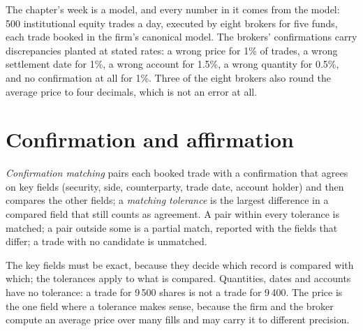The chapter's week is a model, and every number in it comes from the model: 500 institutional equity trades a day, executed by eight brokers for
five funds, each trade booked in the firm's canonical model. The brokers' confirmations carry discrepancies planted at stated rates: a wrong
price for 1\% of trades, a wrong settlement date for 1\%, a wrong account for 1.5\%, a wrong quantity for 0.5\%, and no confirmation at all
for 1\%. Three of the eight brokers also round the average price to four decimals, which is not an error at all.

\section{Confirmation and affirmation}

\begin{definition}\label{def:pl:post-trade-systems:matching}
\emph{Confirmation matching} pairs each booked trade with a confirmation that agrees on key fields (security,
side, counterparty, trade date, account holder) and then compares the other fields; a \emph{matching tolerance} is
the largest difference in a compared field that still counts as agreement. A pair within every tolerance is matched; a pair outside some is a
partial match, reported with the fields that differ; a trade with no candidate is unmatched.
\end{definition}

\label{lst:pl:post-trade-systems:match}

The key fields must be exact, because they decide which record is compared with which; the tolerances apply to what is compared. Quantities,
dates and accounts have no tolerance: a trade for 9\,500 shares is not a trade for 9\,400. The price is the one field where a tolerance makes
sense, because the firm and the broker compute an average price over many fills and may carry it to different precision.


